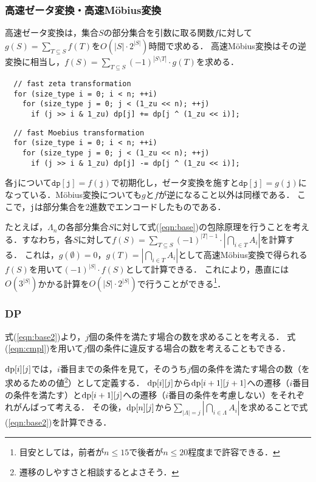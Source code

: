 \documentclass{jsarticle}
\newcommand{\DP}{\ensuremath\mathrm{dp}}
\begin{document}
\subsubsection{高速ゼータ変換・高速M\"obius変換}
高速ゼータ変換は，集合$S$の部分集合を引数に取る関数$f$に対して$g(S)=\sum_{T\subseteq S} f(T)$を$O(|S|\cdot 2^{|S|})$時間で求める．
高速M\"obius変換はその逆変換に相当し，$f(S)=\sum_{T\subseteq S} (-1)^{|S\setminus T|}\cdot g(T)$を求める．
\begin{verbatim}
  // fast zeta transformation
  for (size_type i = 0; i < n; ++i)
    for (size_type j = 0; j < (1_zu << n); ++j)
      if (j >> i & 1_zu) dp[j] += dp[j ^ (1_zu << i)];
\end{verbatim}
\begin{verbatim}
  // fast Moebius transformation
  for (size_type i = 0; i < n; ++i)
    for (size_type j = 0; j < (1_zu << n); ++j)
      if (j >> i & 1_zu) dp[j] -= dp[j ^ (1_zu << i)];
\end{verbatim}
各\texttt{j}について$\mathtt{dp}[\mathtt{j}] = f(\mathtt{j})$で初期化し，ゼータ変換を施すと$\mathtt{dp}[\mathtt{j}] = g(\mathtt{j})$になっている．M\"obius変換についても$g$と$f$が逆になること以外は同様である．
ここで，\texttt{j}は部分集合を2進数でエンコードしたものである．

たとえば，$\Lambda_n$の各部分集合$S$に対して式(\ref{eqn:base})の包除原理を行うことを考える．すなわち，各$S$に対して$f(S)=\sum_{T\subseteq S} (-1)^{|T|-1}\cdot \left|\bigcap_{i\in T}A_i\right|$を計算する．
これは，$g(\emptyset)=0$，$g(T) = \left|\bigcap_{i\in T} A_i\right|$として高速M\"obius変換で得られる$f(S)$を用いて$(-1)^{|S|}\cdot f(S)$として計算できる．
これにより，愚直には$O(3^{|S|})$かかる計算を$O(|S|\cdot 2^{|S|})$で行うことができる\footnote{目安としては，前者が$n\le 15$で後者が$n\le 20$程度まで許容できる．}．

\subsubsection{DP}
式(\ref{eqn:base2})より，$j$個の条件を満たす場合の数を求めることを考える．
式(\ref{eqn:cmpl})を用いて$j$個の条件に違反する場合の数を考えることもできる．

$\DP[i][j]$では，$i$番目までの条件を見て，そのうち$j$個の条件を満たす場合の数（を求めるための値\footnote{遷移のしやすさと相談するとよさそう．}）として定義する．
$\DP[i][j]$から$\DP[i+1][j+1]$への遷移（$i$番目の条件を満たす）と$\DP[i+1][j]$への遷移（$i$番目の条件を考慮しない）をそれぞれがんばって考える．
その後，$\DP[n][j]$から$\sum_{|\Lambda|=j}\left|\bigcap_{i\in\Lambda} A_i\right|$を求めることで式(\ref{eqn:base2})を計算できる．
\end{document}
